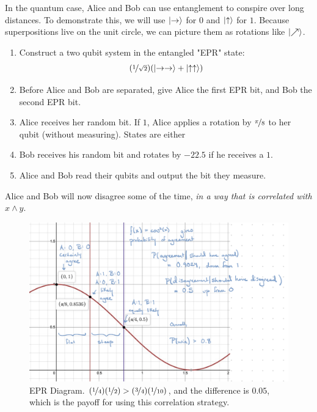 \documentclass{article}
\begin{document}
In the quantum case, Alice and Bob can use entanglement to conspire over long distances. To demonstrate this, we will use $\ket{\to}$ for $0$ and $\ket{\uparrow}$ for $1$. Because superpositions live on the unit circle, we can picture them as rotations like $\ket{\nearrow}$.
\begin{enumerate}
    \item Construct a two qubit system in the entangled "EPR" state:
    \begin{equation}
        (\nicefrac{1}{\sqrt{2}})(\ket{\to \to} + \ket{\uparrow \uparrow})
    \end{equation}
    \item Before Alice and Bob are separated, give Alice the first EPR bit, and Bob the second EPR bit.
    \item Alice receives her random bit. If $1$, Alice applies a rotation by $\nicefrac{\pi}{8}$ to her qubit (without measuring). States are either 
    \item Bob receives his random bit and rotates by $-22.5$ if he receives a $1$.
    \item Alice and Bob read their qubits and output the bit they measure.
\end{enumerate}
Alice and Bob will now disagree some of the time, \textit{in a way that is correlated with $x\land y$}.
\begin{figure}
    \centering
    \includegraphics[width=\textwidth]{pics/EPR_Diagram.jpeg}
    \caption{EPR Diagram. $(\nicefrac{1}{4})(\nicefrac{1}{2}) > (\nicefrac{3}{4})(\nicefrac{1}{10})$, and the difference is $0.05$, which is the payoff for using this correlation strategy.}
    \label{fig:epr_diagram}
\end{figure}
\end{document}
